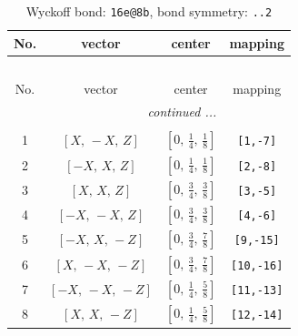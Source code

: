 \documentclass[fleqn,8pt]{jsarticle}
\begin{document}
\begin{longtable}{cccc}
\caption{Wyckoff bond: {\tt 16e@8b}, bond symmetry: {\tt ..2}}
 \\
 \hline \hline
No. & vector & center & mapping \\ \hline \endfirsthead

\multicolumn{3}{l}{\tablename\ \thetable{}} \\
 \hline \hline
No. & vector & center & mapping \\ \hline \endhead

 \hline \hline
\multicolumn{3}{r}{\footnotesize\it continued ...} \\ \endfoot

 \hline \hline
\multicolumn{3}{r}{} \\ \endlastfoot

1 & $\left[ X,\, - X,\, Z \right]$ & $\left[ 0,\, \frac{1}{4},\, \frac{1}{8} \right]$ & {\tt [1,-7]} \\ \hline
2 & $\left[ - X,\, X,\, Z \right]$ & $\left[ 0,\, \frac{1}{4},\, \frac{1}{8} \right]$ & {\tt [2,-8]} \\ \hline
3 & $\left[ X,\, X,\, Z \right]$ & $\left[ 0,\, \frac{3}{4},\, \frac{3}{8} \right]$ & {\tt [3,-5]} \\ \hline
4 & $\left[ - X,\, - X,\, Z \right]$ & $\left[ 0,\, \frac{3}{4},\, \frac{3}{8} \right]$ & {\tt [4,-6]} \\ \hline
5 & $\left[ - X,\, X,\, - Z \right]$ & $\left[ 0,\, \frac{3}{4},\, \frac{7}{8} \right]$ & {\tt [9,-15]} \\ \hline
6 & $\left[ X,\, - X,\, - Z \right]$ & $\left[ 0,\, \frac{3}{4},\, \frac{7}{8} \right]$ & {\tt [10,-16]} \\ \hline
7 & $\left[ - X,\, - X,\, - Z \right]$ & $\left[ 0,\, \frac{1}{4},\, \frac{5}{8} \right]$ & {\tt [11,-13]} \\ \hline
8 & $\left[ X,\, X,\, - Z \right]$ & $\left[ 0,\, \frac{1}{4},\, \frac{5}{8} \right]$ & {\tt [12,-14]} \\
\end{longtable}
\renewcommand{\arraystretch}{1.2}
\end{document}
